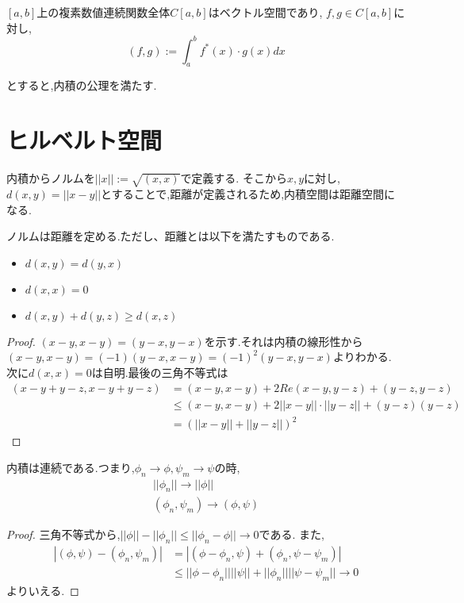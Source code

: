\documentclass[uplatex]{jsbook}
\begin{document}
\begin{epl}
$[a, b]$上の複素数値連続関数全体$C[a,b]$はベクトル空間であり,
$f, g \in C[a, b]$に対し,
\begin{equation*}
 (f, g) :=  \int_a^b f^*(x) \cdot g(x) dx
\end{equation*}
\end{epl}
とすると,内積の公理を満たす.

\section{ヒルベルト空間}
内積からノルムを$||x||:= \sqrt{(x, x)}$で定義する.
そこから$x, y$に対し,$d(x, y) = ||x -y||$とすることで,距離が定義されるため,内積空間は距離空間になる.
\begin{lem}
ノルムは距離を定める.ただし、距離とは以下を満たすものである.
\begin{itemize}
    \item $d(x,y) = d(y,x)$
    \item $d(x,x) = 0$
    \item $d(x, y) + d(y, z) \ge d(x,z)$
\end{itemize}
\end{lem}
\begin{proof}
$(x-y, x- y) = (y-x, y-x)$を示す.それは内積の線形性から$(x-y, x-y)= (-1)(y-x, x-y) = (-1)^2(y-x, y-x)$よりわかる.
次に$d(x, x) =0$は自明.最後の三角不等式は
\begin{align*}
(x-y+y-z, x-y+y-z) &= (x-y, x-y) +2Re(x-y, y-z) + (y-z, y-z) \\
                  & \le (x-y, x-y) +2 ||x-y||\cdot ||y-z|| + (y-z)(y-z)  \\
                  & = (||x-y|| + ||y-z||)^2
\end{align*}
\end{proof}

\begin{lem}
 内積は連続である.つまり,$\phi_n \to \phi, \psi_m \to \psi$の時,
 \begin{align*}
  ||\phi_n|| \to ||\phi||  \\
   (\phi_n, \psi_m) \to (\phi, \psi)
 \end{align*}
\end{lem}
\begin{proof}
三角不等式から,$||\phi|| - ||\phi_n|| \le ||\phi_n - \phi|| \to 0$である.
また,
\begin{align*}
|(\phi, \psi) - (\phi_n, \psi_m)| & = |(\phi - \phi_n, \psi) + (\phi_n, \psi - \psi_m)| \\
                                  & \le ||\phi - \phi_n||||\psi|| + ||\phi_n||||\psi - \psi_m|| \to 0
\end{align*}
よりいえる.
\end{proof}
\end{document}
